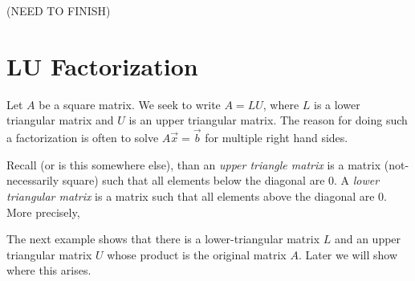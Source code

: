 {\color{red} (NEED TO FINISH)}



\section{LU Factorization}

Let $A$ be a square matrix.  We seek to write $A=LU$, where $L$ is a lower triangular matrix and $U$ is an upper triangular matrix.  The reason for doing such a factorization is often to solve $A\vec{x}=\vec{b}$ for multiple right hand sides.   

Recall (or is this somewhere else), than an \emph{upper triangle matrix} is a matrix (not-necessarily square) such that all elements below the diagonal are 0.  A \emph{lower triangular matrix} is a matrix such that all elements above the diagonal are 0.  More precisely,


The next example shows that there is a lower-triangular matrix $L$ and an upper triangular matrix $U$ whose product is the original matrix $A$.  Later we will show where this arises.  

